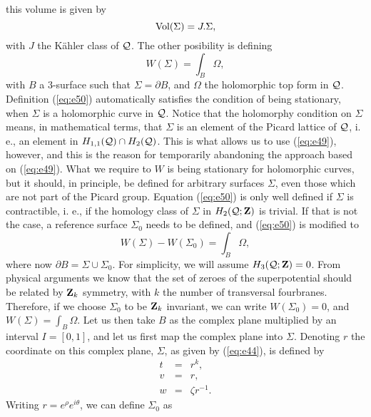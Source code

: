 this volume is given by
\begin{equation}
\hbox {Vol} (\Sigma)= J . \Sigma,
\label{eq:e49}
\end{equation}
with $J$ the K\"ahler class of ${\cal Q}$. The other posibility is defining 
\begin{equation}
W(\Sigma) = \int_B \Omega,
\label{eq:e50}
\end{equation}
with $B$ a $3$-surface such that $\Sigma=\partial B$, and
$\Omega$ the holomorphic top form in ${\cal Q}$. Definition
(\ref{eq:e50}) automatically satisfies the condition of being
stationary, when $\Sigma$ is a holomorphic curve in ${\cal Q}$.
Notice that the holomorphy condition on $\Sigma$ means, in
mathematical terms, that $\Sigma$ is an element of the Picard
lattice of ${\cal Q}$, i. e., an element in $H_{1,1}({\cal Q})
\cap H_2({\cal Q})$. This is what allows us to use
(\ref{eq:e49}), however, and this is the reason for temporarily
abandoning the approach based on (\ref{eq:e49}). What we require
to $W$ is being stationary for holomorphic curves, but it should,
in principle, be defined for arbitrary surfaces $\Sigma$, even
those which are not part of the Picard group. Equation
(\ref{eq:e50}) is only well defined if $\Sigma$ is contractible,
i. e., if the homology class of $\Sigma$ in $H_2({\cal Q};{\bf
Z})$ is trivial. If that is not the case, a reference surface
$\Sigma_0$ needs to be defined, and (\ref{eq:e50}) is modified to
\begin{equation}
W(\Sigma) - W(\Sigma_0) = \int _B \Omega,
\label{q:e51}
\end{equation}
where now $\partial B= \Sigma \cup \Sigma_0$. For simplicity, we
will assume $H_3({\cal Q};{\bf Z})=0$. From physical arguments we
know that the set of zeroes of the superpotential should be
related by ${\bf Z}_k$ symmetry, with $k$ the number of
transversal fourbranes. Therefore, if we choose $\Sigma_0$ to be
${\bf Z}_k$ invariant, we can write $W(\Sigma_0)=0$, and
$W(\Sigma)=\int_B \Omega$. Let us then take $B$ as the complex
plane multiplied by an interval $I=[0,1]$, and let us first map
the complex plane into $\Sigma$. Denoting $r$ the coordinate on
this complex plane, $\Sigma$, as given by (\ref{eq:e44}), is
defined by
\begin{eqnarray}
t & = & r^k, \nonumber \\
v & = & r,   \nonumber \\
w & = & \zeta r^{-1}.
\label{eq:e52}
\end{eqnarray}
Writing $r=e^{\rho}e^{i \theta}$, we can define $\Sigma_0$ as
